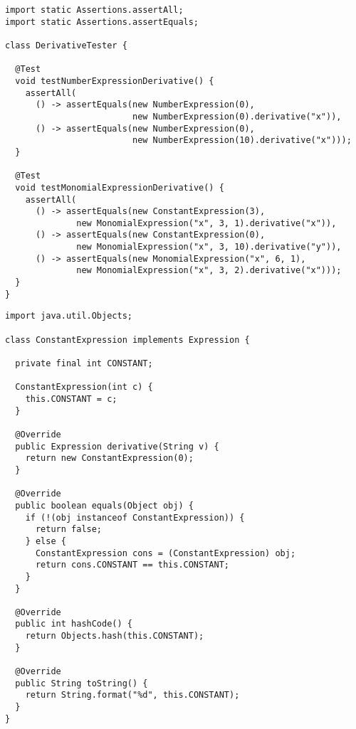 \begin{lstlisting}[language=MyJava]
import static Assertions.assertAll;
import static Assertions.assertEquals;

class DerivativeTester {

  @Test
  void testNumberExpressionDerivative() {
    assertAll(
      () -> assertEquals(new NumberExpression(0),
                         new NumberExpression(0).derivative("x")),
      () -> assertEquals(new NumberExpression(0),
                         new NumberExpression(10).derivative("x")));
  }

  @Test
  void testMonomialExpressionDerivative() {
    assertAll(
      () -> assertEquals(new ConstantExpression(3),
              new MonomialExpression("x", 3, 1).derivative("x")),
      () -> assertEquals(new ConstantExpression(0),
              new MonomialExpression("x", 3, 10).derivative("y")),
      () -> assertEquals(new MonomialExpression("x", 6, 1),
              new MonomialExpression("x", 3, 2).derivative("x")));
  }
}
\end{lstlisting}


\begin{lstlisting}[language=MyJava]
import java.util.Objects;

class ConstantExpression implements Expression {

  private final int CONSTANT;

  ConstantExpression(int c) { 
    this.CONSTANT = c; 
  }

  @Override
  public Expression derivative(String v) { 
    return new ConstantExpression(0); 
  }

  @Override
  public boolean equals(Object obj) {
    if (!(obj instanceof ConstantExpression)) { 
      return false; 
    } else { 
      ConstantExpression cons = (ConstantExpression) obj;
      return cons.CONSTANT == this.CONSTANT; 
    }
  }

  @Override
  public int hashCode() { 
    return Objects.hash(this.CONSTANT); 
  }

  @Override
  public String toString() { 
    return String.format("%d", this.CONSTANT); 
  }
}
\end{lstlisting}

